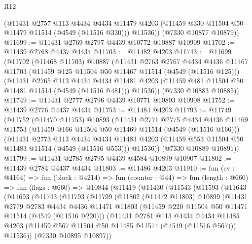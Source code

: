 \begin{lexlean}{R12}
\begin{coremodule}
        (@11431
          @2757
          @113
          @4434
          @4434
          @11479
          @4203
          (@11459 @330 @11504 @50 @11479 @11514 (@4549 (@11516 @330)))
          @11536))
      (@7330 @10877 @10879))
@11699 := @11431 @2769 @2797 @4439 @10772 @10887 @10909
@11702 := @11439 @2768 @4437 @4434
@11703 := @11482 @4203
@11743 := @11699
    (@11702
      (@11468 @11703)
      @10887
      (@11431
        @2763
        @2767
        @4434
        @4436
        @11467
        @11703
        (@11459 @125 @11504 @50 @11467 @11514 (@4549 (@11516 @125)))
        (@11431
          @2765
          @113
          @4434
          @4434
          @11481
          @4203
          (@11459 @481 @11504 @50 @11481 @11514 (@4549 (@11516 @481)))
          @11536))
      (@7330 @10883 @10885))
@11749 := @11431 @2777 @2796 @4439 @10771 @10893 @10908
@11752 := @11439 @2776 @4437 @4434
@11753 := @11484 @4203
@11793 := @11749
    (@11752
      (@11470 @11753)
      @10893
      (@11431
        @2771
        @2775
        @4434
        @4436
        @11469
        @11753
        (@11459 @166 @11504 @50 @11469 @11514 (@4549 (@11516 @166)))
        (@11431
          @2773
          @113
          @4434
          @4434
          @11483
          @4203
          (@11459 @553 @11504 @50 @11483 @11514 (@4549 (@11516 @553)))
          @11536))
      (@7330 @10889 @10891))
@11799 := @11431 @2785 @2795 @4439 @4584 @10899 @10907
@11802 := @11439 @2784 @4437 @4434
@11803 := @11486 @4203
@11910 := fun (cv : @4164) =>
  fun (block : @4214) =>
  fun (counter : @44) =>
  fun (length : @660) =>
  fun (flags : @660) =>
  @10844
    (@11419
      (@11430
        (@11543
          (@11593
            (@11643
              (@11693
                (@11743
                  (@11793
                    (@11799
                      (@11802
                        (@11472 @11803)
                        @10899
                        (@11431
                          @2779
                          @2783
                          @4434
                          @4436
                          @11471
                          @11803
                          (@11459 @220 @11504 @50 @11471 @11514 (@4549 (@11516 @220)))
                          (@11431
                            @2781
                            @113
                            @4434
                            @4434
                            @11485
                            @4203
                            (@11459 @567 @11504 @50 @11485 @11514 (@4549 (@11516 @567)))
                            @11536))
                        (@7330 @10895 @10897))

\end{coremodule}
\end{lexlean}
